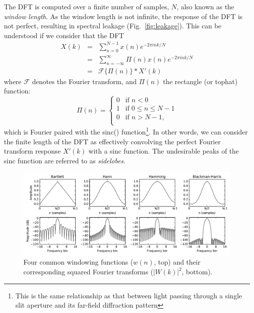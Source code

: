 \documentclass{ws-rv961x669}
\begin{document}
The DFT is computed over a finite number of samples, $N$, also known as the \emph{window length}. As the window length is not infinite, the response of the DFT is not perfect, resulting in spectral leakage (Fig.~\ref{fig:leakage}). This can be understood if we consider that the DFT
\begin{eqnarray}
X(k) & = & \sum_{n=0}^{N-1}x(n)e^{-2\pi ink/N} \\
     & = &  \sum_{n=-\infty}^{\infty} \Pi (n)x(n)e^{-2\pi ink/N}\\
     & = & \mathcal{F}\{\Pi(n)\}*X'(k) \label{eq:dft_tophat}
\end{eqnarray}
where $\mathcal{F}$ denotes the Fourier transform, and $\Pi(n)$ the rectangle (or tophat) function:
\begin{equation}
\Pi(n) = \begin{cases}
	0 & \mbox{if } n < 0 \\
	1 & \mbox{if } 0 \leq n \leq N-1 \\
	0 & \mbox{if } n > N-1, \\
\end{cases}	
\end{equation}
which is Fourier paired with the sinc() function\footnote{This is the same relationship as that between light passing through a single slit aperture and its far-field diffraction pattern}. In other words, we can consider the finite length of the DFT as effectively convolving the perfect Fourier transform response $X'(k)$ with a sinc function. The undesirable peaks of the sinc function are referred to as \emph{sidelobes}.

\begin{figure}[t]
 \centering
 \includegraphics[width=\textwidth]{./figures/window_fns}
 \caption{Four common windowing functions ($w(n)$, top) and their corresponding squared Fourier transforms ($|W(k)|^2$, bottom). %
 \label{fig:window_fns}}
\end{figure}
\end{document}
